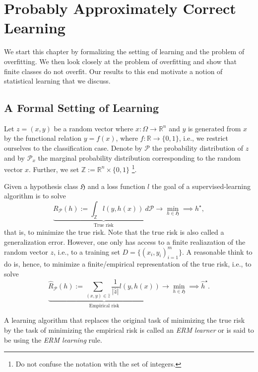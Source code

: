 \section{Probably Approximately Correct Learning}

We start this chapter by formalizing the setting of learning and the problem of
overfitting. We then look closely at the problem of overfitting and show that
finite classes do not overfit. Our results to this end motivate a notion of
statistical learning that we discuss.

\subsection{A Formal Setting of Learning}
Let $z = (x, y)$ be a random vector where $x: \Omega \to \mathbb{R}^n$ and $y$
is generated from $x$ by the functional relation $y=f(x)$, where $f: \mathbb{R}
\to \{0,1\}$, i.e., we restrict ourselves to the classification case. Denote by
$\mathcal{P}$ the probability distribution of $z$ and by $\mathcal{P}_x$ the
marginal probability distribution corresponding to the random vector $x$.
Further, we set $\mathbb{Z} := \mathbb{R}^n \times \{0,1\}$ \footnote{Do not
confuse the notation with the set of integers.}.

Given a hypothesis class $\mathfrak{H}$  and a loss function $l$ the goal of a supervised-learning
algorithm is to solve 
\begin{equation*}
    \underbrace{R_{\mathcal{P}}(h) := \int_{\mathbb{Z}} l(y, h(x)) \ d \mathcal{P}}_{\text{True risk}} \longrightarrow \min_{h \in \mathfrak{H}} \implies h^\star, 
\end{equation*}
that is, to minimize the true risk. Note that the true risk is also called a
generalization error. However, one only has access to a finite
realiazation of the random vector $z$, i.e., to a training set $D=\{(x_i,
y_i)_{i=1}^m\}$. A reasonable think to do is, hence, to minimize a
finite/empirical representation of the true risk, i.e., to solve
\begin{equation*}
    \underbrace{\hat{R}_{\mathcal{P}} (h) := \sum_{(x,y) \in \hat{z}} \frac{1}{|\hat{z}|}l(y, h(x)) }_{\text{Empirical risk}} \longrightarrow \min_{h \in \mathfrak{H}} \implies \hat{h}^\star.
\end{equation*}

A learning algorithm that replaces the original task of minimizing the true risk
by the task of minimizing the empirical risk is called an \emph{ERM learner} or
is said to be using the \emph{ERM learning} rule. 


